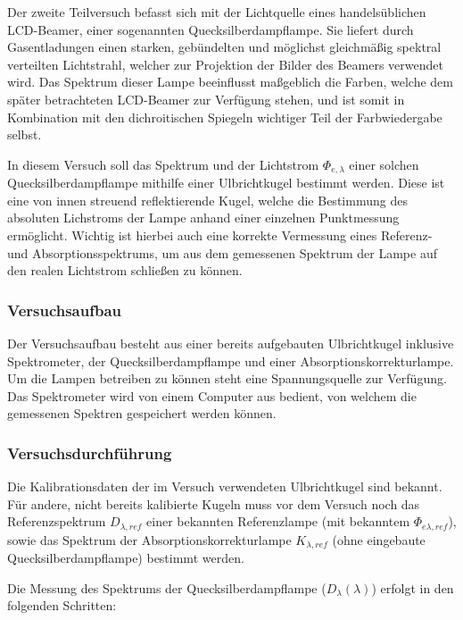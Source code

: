 Der zweite Teilversuch befasst sich mit der Lichtquelle eines handelsüblichen LCD-Beamer, einer sogenannten Quecksilberdampflampe. Sie liefert durch Gasentladungen einen starken, gebündelten und möglichst gleichmäßig spektral verteilten Lichtstrahl, welcher zur Projektion der Bilder des Beamers verwendet wird. Das Spektrum dieser Lampe beeinflusst maßgeblich die Farben, welche dem später betrachteten LCD-Beamer zur Verfügung stehen, und ist somit in Kombination mit den dichroitischen Spiegeln wichtiger Teil der Farbwiedergabe selbst.

In diesem Versuch soll das Spektrum und der Lichtstrom $\Phi_{e,\lambda}$ einer solchen Quecksilberdampflampe mithilfe einer Ulbrichtkugel bestimmt werden. Diese ist eine von innen streuend reflektierende Kugel, welche die Bestimmung des absoluten Lichstroms der Lampe anhand einer einzelnen Punktmessung ermöglicht. Wichtig ist hierbei auch eine korrekte Vermessung eines Referenz- und Absorptionsspektrums, um aus dem gemessenen Spektrum der Lampe auf den realen Lichtstrom schließen zu können.

\subsubsection{Versuchsaufbau}

Der Versuchsaufbau besteht aus einer bereits aufgebauten Ulbrichtkugel inklusive Spektrometer, der Quecksilberdampflampe und einer Absorptionskorrekturlampe. Um die Lampen betreiben zu können steht eine Spannungsquelle zur Verfügung. Das Spektrometer wird von einem Computer aus bedient, von welchem die gemessenen Spektren gespeichert werden können.

\subsubsection{Versuchsdurchführung}

Die Kalibrationsdaten der im Versuch verwendeten Ulbrichtkugel sind bekannt. Für andere, nicht bereits kalibierte Kugeln muss vor dem Versuch noch das Referenzspektrum $D_{\lambda,ref}$ einer bekannten Referenzlampe (mit bekanntem $\Phi_{e\lambda,ref}$), sowie das Spektrum der Absorptionskorrekturlampe $K_{\lambda,ref}$ (ohne eingebaute Quecksilberdampflampe) bestimmt werden.

Die Messung des Spektrums der Quecksilberdampflampe ($D_\lambda(\lambda)$) erfolgt in den folgenden Schritten:

